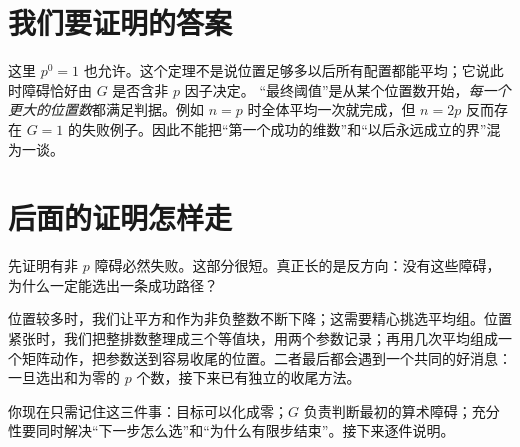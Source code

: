\section{我们要证明的答案}
这里 $p^0=1$ 也允许。这个定理不是说位置足够多以后所有配置都能平均；它说此时障碍恰好由 $G$ 是否含非 $p$ 因子决定。
“最终阈值”是从某个位置数开始，\emph{每一个更大的位置数}都满足判据。例如 $n=p$ 时全体平均一次就完成，但 $n=2p$ 反而存在 $G=1$ 的失败例子。因此不能把“第一个成功的维数”和“以后永远成立的界”混为一谈。

\section{后面的证明怎样走}
先证明有非 $p$ 障碍必然失败。这部分很短。真正长的是反方向：没有这些障碍，为什么一定能选出一条成功路径？

位置较多时，我们让平方和作为非负整数不断下降；这需要精心挑选平均组。位置紧张时，我们把整排数整理成三个等值块，用两个参数记录；再用几次平均组成一个矩阵动作，把参数送到容易收尾的位置。二者最后都会遇到一个共同的好消息：一旦选出和为零的 $p$ 个数，接下来已有独立的收尾方法。

你现在只需记住这三件事：目标可以化成零；$G$ 负责判断最初的算术障碍；充分性要同时解决“下一步怎么选”和“为什么有限步结束”。接下来逐件说明。

